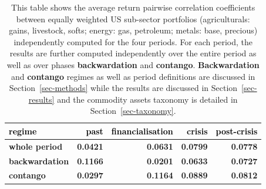 \documentclass[
  authoryear,
  preprint,
  3p]{elsarticle}
\begin{document}
\begin{longtable}[t]{>{}l>{}r>{}r>{}r>{}r}

\caption{\label{tbl-correlations-cross-periods}This table shows the
average return pairwise correlation coefficients between equally
weighted US sub-sector portfolios (agriculturals: gains, livestock,
softs; energy: gas, petroleum; metals: base, precious) independently
computed for the four periods. For each period, the results are further
computed independently over the entire period as well as over phases
\textbf{backwardation} and \textbf{contango}. \textbf{Backwardation} and
\textbf{contango} regimes as well as period definitions are discussed in
Section~\ref{sec-methods} while the results are discussed in
Section~\ref{sec-results} and the commodity assets taxonomy is detailed
in Section~\ref{sec-taxonomy}.}

\tabularnewline

\toprule
\textcolor{black}{\textbf{regime}} & \textcolor{black}{\textbf{past}} & \textcolor{black}{\textbf{financialisation}} & \textcolor{black}{\textbf{crisis}} & \textcolor{black}{\textbf{post-crisis}}\\
\midrule
\textbf{whole period} & \textcolor[HTML]{4285f4}{\textbf{0.0421}} & \textcolor[HTML]{4285f4}{\textbf{0.0631}} & \textcolor[HTML]{4285f4}{\textbf{0.0799}} & \textcolor[HTML]{4285f4}{\textbf{0.0778}}\\
\textbf{backwardation} & \textcolor[HTML]{4285f4}{\textbf{0.1166}} & \textcolor[HTML]{4285f4}{\textbf{0.0201}} & \textcolor[HTML]{4285f4}{\textbf{0.0633}} & \textcolor[HTML]{4285f4}{\textbf{0.0727}}\\
\textbf{contango} & \textcolor[HTML]{4285f4}{\textbf{0.0297}} & \textcolor[HTML]{4285f4}{\textbf{0.1164}} & \textcolor[HTML]{4285f4}{\textbf{0.0889}} & \textcolor[HTML]{4285f4}{\textbf{0.0812}}\\
\bottomrule

\end{longtable}

\endgroup{}

\newpage
\end{document}
